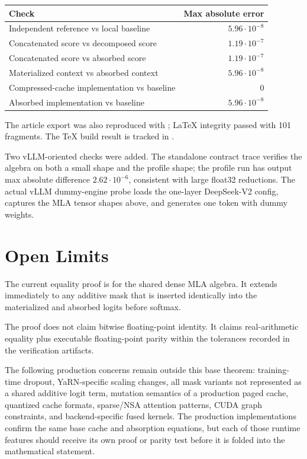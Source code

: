 \documentclass[11pt]{article}
\begin{document}
\begin{center}
\begin{tabular}{lr}
\toprule
Check & Max absolute error \\
\midrule
Independent reference vs local baseline & $5.96\cdot 10^{-8}$ \\
Concatenated score vs decomposed score & $1.19\cdot 10^{-7}$ \\
Concatenated score vs absorbed score & $1.19\cdot 10^{-7}$ \\
Materialized context vs absorbed context & $5.96\cdot 10^{-8}$ \\
Compressed-cache implementation vs baseline & $0$ \\
Absorbed implementation vs baseline & $5.96\cdot 10^{-8}$ \\
\bottomrule
\end{tabular}
\end{center}

The article export was also reproduced with
; LaTeX integrity passed with
101 fragments.  The TeX build result is tracked in
.

Two vLLM-oriented checks were added.  The standalone contract trace verifies
the algebra on both a small shape and the profile shape; the profile run has
output max absolute difference $2.62\cdot 10^{-6}$, consistent with large
float32 reductions.  The actual vLLM dummy-engine probe loads the one-layer
DeepSeek-V2 config, captures the MLA tensor shapes above, and generates one
token with dummy weights.

\section{Open Limits}

The current equality proof is for the shared dense MLA algebra.  It extends
immediately to any additive mask that is inserted identically into the
materialized and absorbed logits before softmax.

The proof does not claim bitwise floating-point identity.  It claims
real-arithmetic equality plus executable floating-point parity within the
tolerances recorded in the verification artifacts.

The following production concerns remain outside this base theorem:
training-time dropout, YaRN-specific scaling changes, all mask variants not
represented as a shared additive logit term, mutation semantics of a production
paged cache, quantized cache formats, sparse/NSA attention patterns, CUDA graph
constraints, and backend-specific fused kernels.  The production
implementations confirm the same base cache and absorption equations, but each
of those runtime features should receive its own proof or parity test before it
is folded into the mathematical statement.
\end{document}
